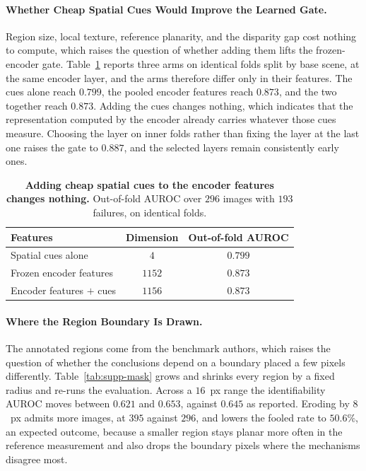 \documentclass{article} %
\theoremstyle{defstyle}
\theoremstyle{plain}
\begin{document}
\paragraph{Whether Cheap Spatial Cues Would Improve the Learned Gate.}
Region size, local texture, reference planarity, and the disparity gap cost nothing to
compute, which raises the question of whether adding them lifts the frozen-encoder gate.
Table~\ref{tab:supp-cues} reports three arms on identical folds split by base scene, at the
same encoder layer, and the arms therefore differ only in their features. The cues alone
reach $0.799$, the pooled encoder features reach $0.873$, and the two together reach $0.873$.
Adding the cues changes nothing, which indicates that the representation computed by the
encoder already carries whatever those cues measure. Choosing the layer on inner folds rather
than fixing the layer at the last one raises the gate to $0.887$, and the selected layers remain
consistently early ones.

\begin{table}[!ht]
\caption{\textbf{Adding cheap spatial cues to the encoder features changes nothing.} Out-of-fold
AUROC over $296$ images with $193$ failures, on identical folds.}
\label{tab:supp-cues}
\begin{center}
\footnotesize
\begin{tabular}{lcc}
\toprule
\textbf{Features} & \textbf{Dimension} & \textbf{Out-of-fold AUROC} \\
\midrule
Spatial cues alone & $4$ & $0.799$ \\
Frozen encoder features & $1152$ & $\mathbf{0.873}$ \\
Encoder features $+$ cues & $1156$ & $0.873$ \\
\bottomrule
\end{tabular}
\end{center}
\end{table}

\paragraph{Where the Region Boundary Is Drawn.}
The annotated regions come from the benchmark authors, which raises the question of whether
the conclusions depend on a boundary placed a few pixels differently.
Table~\ref{tab:supp-mask} grows and shrinks every region by a fixed radius and re-runs the
evaluation. Across a $16$~px range the identifiability AUROC moves between $0.621$ and
$0.653$, against $0.645$ as reported. Eroding by $8$~px admits more images, at $395$ against
$296$, and lowers the fooled rate to $50.6\%$, an expected outcome, because a smaller region
stays planar more often in the reference measurement and also drops the boundary pixels where
the mechanisms disagree most.
\end{document}
